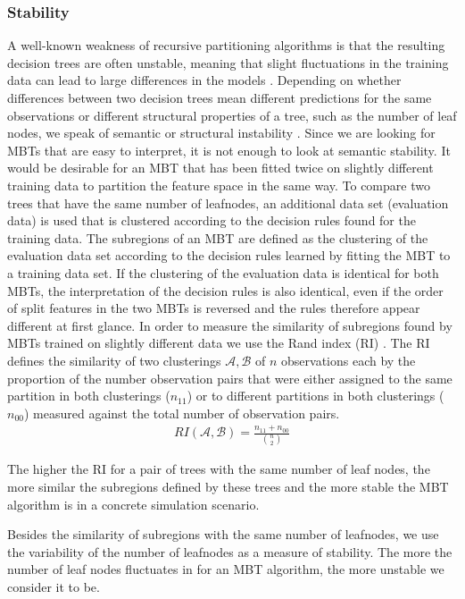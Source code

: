 \subsubsection{Stability}
A well-known weakness of recursive partitioning algorithms is that the resulting decision trees are often unstable, meaning that slight fluctuations in the training data can lead to large differences in the models \citep{Fokkema.2020}.
Depending on whether differences between two decision trees mean different predictions for the same observations or different structural properties of a tree, such as the number of leaf nodes, we speak of semantic or structural instability \citep{Wang.2018}. 
Since we are looking for MBTs that are easy to interpret, it is not enough to look at semantic stability. It would be desirable for an MBT that has been fitted twice on slightly different training data to partition the feature space in the same way. To compare two trees that have the same number of leafnodes, an additional data set (evaluation data) is used that is clustered according to the decision rules found for the training data. The subregions of an MBT are defined as the clustering of the evaluation data set according to the decision rules learned by fitting the MBT to a training data set. 
If the clustering of the evaluation data is identical for both MBTs, the interpretation of the decision rules is also identical, even if the order of split features in the two MBTs is reversed and the rules therefore appear different at first glance.
In order to measure the similarity of subregions found by MBTs trained on slightly different data we use the Rand index (RI) \citep{Rand.1971}. The RI defines the similarity of two clusterings $\mathcal{A}, \mathcal{B}$ of $n$ observations each by the proportion of  the number observation pairs that were either assigned to the same partition in both clusterings ($n_{11}$) or to different partitions in both clusterings ($n_{00}$) measured against the total number of observation pairs. 
\begin{align}
    RI(\mathcal{A}, \mathcal{B}) = \frac{n_{11} + n_{00}}{\binom{n}{2}}
\end{align}
\citep{Gates.2017}

The higher the RI for a pair of trees with the same number of leaf nodes, the more similar the subregions defined by these trees and the more stable the MBT algorithm is in a concrete simulation scenario. 


Besides the similarity of subregions with the same number of leafnodes, we use the variability of the number of leafnodes as a measure of stability. The more the number of leaf nodes fluctuates in for an MBT algorithm, the more unstable we consider it to be.

